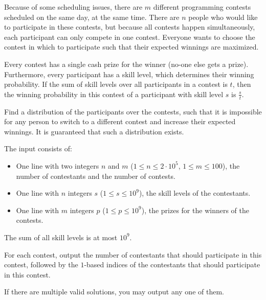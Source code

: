 \problemname{}


\newcommand{\maxn}{2\cdot10^5}
\newcommand{\maxm}{100}
\newcommand{\maxs}{10^9}
\newcommand{\maxp}{10^9}

Because of some scheduling issues, there are $m$ different programming contests
scheduled on the same day, at the same time. There are $n$ people who would like
to participate in these contests, but because all contests happen
simultaneously, each participant can only compete in one contest. Everyone wants
to choose the contest in which to participate such that their expected winnings
are maximized.

Every contest has a single cash prize for the winner (no-one else gets a prize).
Furthermore, every participant has a skill level, which determines their winning
probability. If the sum of skill levels over all participants in a contest is
$t$, then the winning probability in this contest of a participant with skill
level $s$ is $\frac{s}{t}$.

Find a distribution of the participants over the contests, such that it is
impossible for any person to switch to a different contest and increase their
expected winnings. It is guaranteed that such a distribution exists.

\begin{Input}
    The input consists of:
    \begin{itemize}
        \item One line with two integers $n$ and $m$ ($1\leq n\leq \maxn$, $1 \leq m \leq \maxm$),
              the number of contestants and the number of contests.
        \item One line with $n$ integers $s$ ($1\leq s\leq\maxs$),
              the skill levels of the contestants.
        \item One line with $m$ integers $p$ ($1 \leq p \leq \maxp$),
              the prizes for the winners of the contests.
    \end{itemize}
    The sum of all skill levels is at most \(\maxs\).
\end{Input}

\begin{Output}
    For each contest,
    output the number of contestants that should participate in this contest,
    followed by the $1$-based indices of the contestants that should participate in this contest.

    If there are multiple valid solutions, you may output any one of them.
\end{Output}
